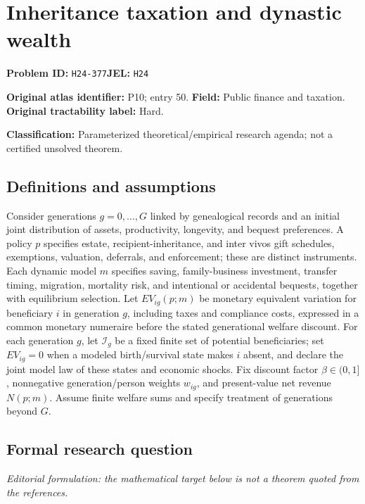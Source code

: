 \documentclass[11pt,a4paper]{article}
\begin{document}
\section*{Inheritance taxation and dynastic wealth}
\textbf{Problem ID:} \texttt{H24-377}\quad \textbf{JEL:} \texttt{H24}\par
\label{problem:OP-0050}
\label{atlas:prob:P10}
\noindent\textbf{Original atlas identifier:} P10; entry 50. \textbf{Field:} Public finance and taxation. \textbf{Original tractability label:} Hard.

\noindent\textbf{Classification:} Parameterized theoretical/empirical research agenda; not a certified unsolved theorem.

\subsection*{Definitions and assumptions}
Consider generations $g=0,\ldots,G$ linked by genealogical records and an initial joint distribution of assets, productivity, longevity, and bequest preferences. A policy $p$ specifies estate, recipient-inheritance, and inter vivos gift schedules, exemptions, valuation, deferrals, and enforcement; these are distinct instruments. Each dynamic model $m$ specifies saving, family-business investment, transfer timing, migration, mortality risk, and intentional or accidental bequests, together with equilibrium selection. Let $EV_{ig}(p;m)$ be monetary equivalent variation for beneficiary $i$ in generation $g$, including taxes and compliance costs, expressed in a common monetary numeraire before the stated generational welfare discount. For each generation $g$, let $\mathcal I_g$ be a fixed finite set of potential beneficiaries; set $EV_{ig}=0$ when a modeled birth/survival state makes $i$ absent, and declare the joint model law of these states and economic shocks. Fix discount factor $\beta\in(0,1]$, nonnegative generation/person weights $w_{ig}$, and present-value net revenue $N(p;m)$. Assume finite welfare sums and specify treatment of generations beyond $G$.

\subsection*{Formal research question}
\emph{Editorial formulation: the mathematical target below is not a theorem quoted from the references.}
\end{document}
